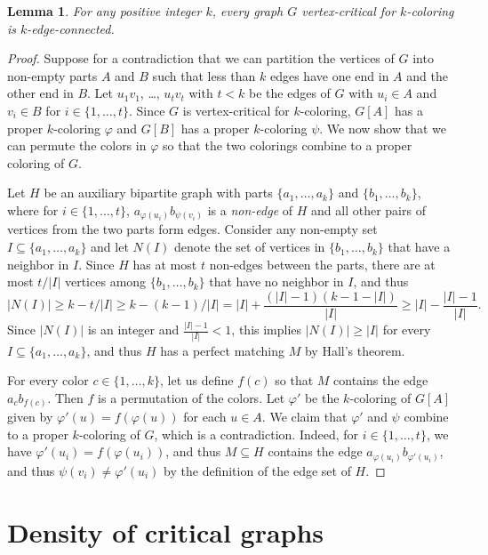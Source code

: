 \documentclass[12pt,twoside,openright,a4paper]{book}
\newtheorem{lemma}[theorem]{Lemma}
\begin{document}
\begin{lemma}\label{lemma:cr-econ}
For any positive integer $k$, every graph $G$ vertex-critical for $k$-coloring is $k$-edge-connected.
\end{lemma}
\begin{proof}
Suppose for a contradiction that we can partition the vertices of $G$ into non-empty parts $A$ and $B$ such that less than $k$ edges have one end in $A$ and the other end in $B$.
Let $u_1v_1$, \ldots, $u_tv_t$ with $t<k$ be the edges of $G$ with $u_i\in A$ and $v_i\in B$ for $i\in\{1,\ldots,t\}$.  Since $G$ is vertex-critical for $k$-coloring,
$G[A]$ has a proper $k$-coloring $\varphi$ and $G[B]$ has a proper $k$-coloring $\psi$.  We now show that we can permute the colors in $\varphi$ so that the two colorings combine to
a proper coloring of $G$.

Let $H$ be an auxiliary bipartite graph with parts $\{a_1,\ldots, a_k\}$ and $\{b_1,\ldots,b_k\}$,
where for $i\in\{1,\ldots,t\}$, $a_{\varphi(u_i)}b_{\psi(v_i)}$ is a \emph{non-edge} of $H$ and all other pairs of vertices from the two parts form edges.
Consider any non-empty set $I\subseteq \{a_1,\ldots, a_k\}$ and let $N(I)$ denote the set of vertices in $\{b_1,\ldots,b_k\}$ that have a neighbor in $I$.
Since $H$ has at most $t$ non-edges between the parts, there are at most $t/|I|$ vertices among $\{b_1,\ldots,b_k\}$ that have no neighbor in $I$, and thus 
$$|N(I)|\ge k-t/|I|\ge k-(k-1)/|I|=|I|+\frac{(|I|-1)(k-1-|I|)}{|I|}\ge |I|-\frac{|I|-1}{|I|}.$$
Since $|N(I)|$ is an integer and $\tfrac{|I|-1}{|I|}<1$, this implies $|N(I)|\ge |I|$ for every $I\subseteq \{a_1,\ldots, a_k\}$,
and thus $H$ has a perfect matching $M$ by Hall's theorem.

For every color $c\in\{1,\ldots,k\}$, let us define $f(c)$ so that $M$ contains the edge $a_cb_{f(c)}$.  Then $f$ is a permutation of the colors.
Let $\varphi'$ be the $k$-coloring of $G[A]$ given by $\varphi'(u)=f(\varphi(u))$ for each $u\in A$.  We claim that $\varphi'$ and $\psi$ combine to a proper $k$-coloring of $G$, which is a contradiction.
Indeed, for $i\in\{1,\ldots,t\}$, we have $\varphi'(u_i)=f(\varphi(u_i))$, and thus $M\subseteq H$ contains the edge $a_{\varphi(u_i)}b_{\varphi'(u_i)}$, and thus
$\psi(v_i)\neq \varphi'(u_i)$ by the definition of the edge set of $H$.
\end{proof}

\section{Density of critical graphs}
\end{document}
